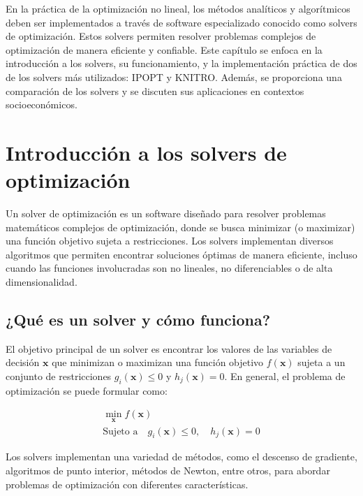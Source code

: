\begin{flushleft}
	En la práctica de la optimización no lineal, los métodos analíticos y algorítmicos deben ser implementados a través de software especializado conocido como solvers de optimización. Estos solvers permiten resolver problemas complejos de optimización de manera eficiente y confiable. Este capítulo se enfoca en la introducción a los solvers, su funcionamiento, y la implementación práctica de dos de los solvers más utilizados: IPOPT y KNITRO. Además, se proporciona una comparación de los solvers y se discuten sus aplicaciones en contextos socioeconómicos.
\end{flushleft}

\section{Introducción a los solvers de optimización}

\begin{flushleft}
	Un solver de optimización es un software diseñado para resolver problemas matemáticos complejos de optimización, donde se busca minimizar (o maximizar) una función objetivo sujeta a restricciones. Los solvers implementan diversos algoritmos que permiten encontrar soluciones óptimas de manera eficiente, incluso cuando las funciones involucradas son no lineales, no diferenciables o de alta dimensionalidad.
\end{flushleft}

\subsection{¿Qué es un solver y cómo funciona?}

\begin{flushleft}
	El objetivo principal de un solver es encontrar los valores de las variables de decisión $\mathbf{x}$ que minimizan o maximizan una función objetivo $f(\mathbf{x})$ sujeta a un conjunto de restricciones $g_{i}(\mathbf{x}) \leq 0$ y $h_{j}(\mathbf{x})=0$. En general, el problema de optimización se puede formular como:
\end{flushleft}

$$
\begin{gathered}
	\min_{\mathbf{x}} f(\mathbf{x}) \\
	\text{Sujeto a} \quad g_{i}(\mathbf{x}) \leq 0, \quad h_{j}(\mathbf{x})=0
\end{gathered}
$$

\begin{flushleft}
	Los solvers implementan una variedad de métodos, como el descenso de gradiente, algoritmos de punto interior, métodos de Newton, entre otros, para abordar problemas de optimización con diferentes características.
\end{flushleft}

